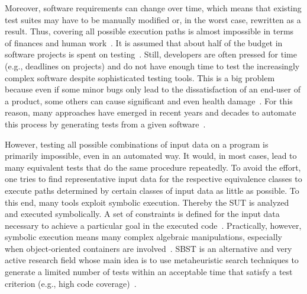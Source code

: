 \documentclass[paper=a4,%
  twoside,%
  BCOR4mm,%
  abstract=true,%
  toc=bibliography,%
  chapterprefix=true,%
  toc=bibliographynumbered,%
  open=right,%
  english,%
  pagesize=pdftex]{scrreprt}
\newcommand{\sut}{\ac{SUT}\xspace}
\begin{document}
Moreover, software requirements can change over time, which means that existing test suites may have to be manually modified or, in the worst case, rewritten as a result. Thus, covering all possible execution paths is almost impossible in terms of finances and human work~\cite{Myers2012}. It is assumed that about half of the budget in software projects is spent on testing~\cite{Beizer2003}. Still, developers are often pressed for time (e.g., deadlines on projects) and do not have enough time to test the increasingly complex software despite sophisticated testing tools. This is a big problem because even if some minor bugs only lead to the dissatisfaction of an end-user of a product, some others can cause significant and even health damage~\cite{Myers2012}. For this reason, many approaches have emerged in recent years and decades to automate this process by generating tests from a given software~\cite{McMinn_2004}.

However, testing all possible combinations of input data on a program is primarily impossible, even in an automated way. It would, in most cases, lead to many equivalent tests that do the same procedure repeatedly. To avoid the effort, one tries to find representative input data for the respective equivalence classes to execute paths determined by certain classes of input data as little as possible. To this end, many tools exploit symbolic execution. Thereby the \sut is analyzed and executed symbolically. A set of constraints is defined for the input data necessary to achieve a particular goal in the executed code~\cite{Clarke1976}. Practically, however, symbolic execution means many complex algebraic manipulations, especially when object-oriented containers are involved~\cite{Korel1990}. \ac{SBST} is an alternative and very active research field whose main idea is to use metaheuristic search techniques to generate a limited number of tests within an acceptable time that satisfy a test criterion (e.g., high code coverage)~\cite{McMinn_2004}.
\end{document}
